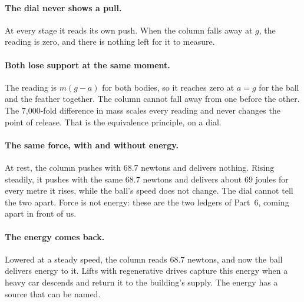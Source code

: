 \documentclass[11pt,a4paper]{article}
\begin{document}
\paragraph{The dial never shows a pull.} At every stage it reads its own push. When the column falls away at $g$, the reading is zero, and there is nothing left for it to measure.

\paragraph{Both lose support at the same moment.} The reading is $m(g-a)$ for both bodies, so it reaches zero at $a=g$ for the ball and the feather together. The column cannot fall away from one before the other. The 7{,}000-fold difference in mass scales every reading and never changes the point of release. That is the equivalence principle, on a dial.

\paragraph{The same force, with and without energy.} At rest, the column pushes with 68.7 newtons and delivers nothing. Rising steadily, it pushes with the same 68.7 newtons and delivers about 69 joules for every metre it rises, while the ball's speed does not change. The dial cannot tell the two apart. Force is not energy: these are the two ledgers of Part~6, coming apart in front of us. 

\paragraph{The energy comes back.} Lowered at a steady speed, the column reads 68.7 newtons, and now the ball delivers energy to it. Lifts with regenerative drives capture this energy when a heavy car descends and return it to the building's supply.  The energy has a source that can be named.
\end{document}
